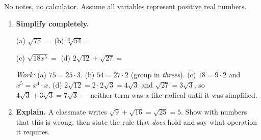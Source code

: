 \documentclass[10pt]{article}
\begin{document}
\namedateperiod

\vspace{0.10in}

No notes, no calculator. Assume all variables represent positive real numbers.

\begin{enumerate}[leftmargin=1.8em, itemsep=10pt]
  \item \textbf{Simplify completely.}

        \vspace{4pt}
        (a) $\sqrt{75} = $  \hspace{0.5in}
        (b) $\sqrt[3]{54} = $ 

        \vspace{4pt}
        (c) $\sqrt{18x^{5}} = $  \hspace{0.4in}
        (d) $2\sqrt{12}+\sqrt{27} = $ 

        \vspace{2pt}
        {\small\emph{Work:} (a) $75=25\cdot3$. \; (b) $54=27\cdot2$ (group in \emph{threes}). \;
        (c) $18=9\cdot2$ and $x^{5}=x^{4}\cdot x$. \;
        (d) $2\sqrt{12}=2\cdot2\sqrt3=4\sqrt3$ and $\sqrt{27}=3\sqrt3$, so $4\sqrt3+3\sqrt3=7\sqrt3$
        --- neither term was a like radical until it was simplified.}

  \item \textbf{Explain.} A classmate writes $\sqrt{9}+\sqrt{16}=\sqrt{25}=5$. Show with numbers
        that this is wrong, then state the rule that \emph{does} hold and say what operation it
        requires.


\end{enumerate}
\end{document}
